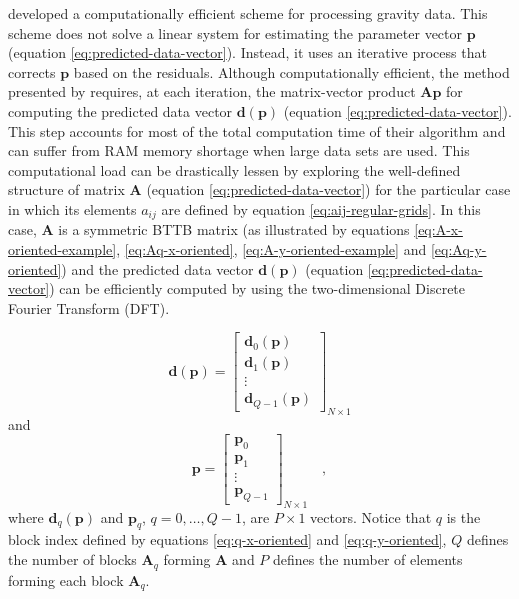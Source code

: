 \documentclass[manuscript,revised]{geophysics}
\begin{document}
\citet{siqueira-etal2017} developed a computationally efficient scheme for processing gravity data. 
This scheme does not solve a linear system for estimating the parameter vector $\mathbf{p}$
(equation \ref{eq:predicted-data-vector}).
Instead, it uses an iterative process that corrects $\mathbf{p}$ based on the residuals. 
Although computationally efficient, the method presented by \citet{siqueira-etal2017} requires, 
at each iteration, the matrix-vector product $\mathbf{A}\mathbf{p}$ for computing the 
predicted data vector $\mathbf{d}(\mathbf{p})$ (equation \ref{eq:predicted-data-vector}).
This step accounts for most of the total computation time of their algorithm and can suffer
from RAM memory shortage when large data sets are used.
This computational load can be drastically lessen by exploring the well-defined structure of 
matrix $\mathbf{A}$ (equation \ref{eq:predicted-data-vector}) for the particular case in which 
its elements $a_{ij}$ are defined by equation \ref{eq:aij-regular-grids}. 
In this case, $\mathbf{A}$ is a symmetric BTTB matrix (as illustrated by equations
\ref{eq:A-x-oriented-example}, \ref{eq:Aq-x-oriented}, \ref{eq:A-y-oriented-example} and
\ref{eq:Aq-y-oriented}) and the predicted data vector 
$\mathbf{d}(\mathbf{p})$ (equation \ref{eq:predicted-data-vector}) can be efficiently
computed by using the two-dimensional Discrete Fourier Transform (DFT).

\begin{equation}
\mathbf{d}(\mathbf{p}) = \begin{bmatrix}
\mathbf{d}_{0}(\mathbf{p}) \\
\mathbf{d}_{1}(\mathbf{p}) \\
\vdots \\
\mathbf{d}_{Q - 1}(\mathbf{p})
\end{bmatrix}_{N \times 1}
\label{eq:predicted-data-vector-partitioned}
\end{equation}
and
\begin{equation}
\mathbf{p} = \begin{bmatrix}
\mathbf{p}_{0} \\
\mathbf{p}_{1} \\
\vdots \\
\mathbf{p}_{Q - 1}
\end{bmatrix}_{N \times 1} \quad ,
\label{eq:parameter-vector-partitioned}
\end{equation}
where $\mathbf{d}_{q}(\mathbf{p})$ and $\mathbf{p}_{q}$, $q = 0, \dots, Q - 1$,
are $P \times 1$ vectors. Notice that $q$ is the block index defined by equations 
\ref{eq:q-x-oriented} and \ref{eq:q-y-oriented}, $Q$ defines the number of blocks
$\mathbf{A}_{q}$ forming $\mathbf{A}$ and $P$ defines the number of elements forming 
each block $\mathbf{A}_{q}$.
\end{document}
